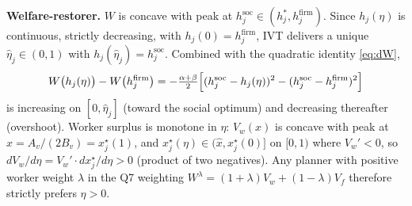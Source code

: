 \documentclass[a4paper,11pt]{article}
\begin{document}
\textbf{Welfare-restorer.} $W$ is concave with peak at $h^{\mathrm{soc}}_j\!\in\!(h^{*}_j,h^{\mathrm{firm}}_j)$. Since $h_j(\eta)$ is continuous, strictly decreasing, with $h_j(0)\!=\!h^{\mathrm{firm}}_j$, IVT delivers a unique $\hat\eta_j\!\in\!(0,1)$ with $h_j(\hat\eta_j)\!=\!h^{\mathrm{soc}}_j$. Combined with the quadratic identity \eqref{eq:dW},
\[
W\bigl(h_j(\eta)\bigr)-W\bigl(h^{\mathrm{firm}}_j\bigr)=-\tfrac{\alpha+\beta}{2}\Bigl[(h^{\mathrm{soc}}_j-h_j(\eta))^{2}-(h^{\mathrm{soc}}_j-h^{\mathrm{firm}}_j)^{2}\Bigr]
\]
is increasing on $[0,\hat\eta_j]$ (toward the social optimum) and decreasing thereafter (overshoot). Worker surplus is monotone in $\eta$: $V_w(x)$ is concave with peak at $\hat x\!=\!A_v/(2B_v)\!=\!x_j^{\star}(1)$, and $x_j^{\star}(\eta)\!\in\!(\hat x,x_j^{\star}(0)]$ on $[0,1)$ where $V_w'<0$, so $dV_w/d\eta\!=\!V_w'\cdot dx_j^{\star}/d\eta>0$ (product of two negatives). Any planner with positive worker weight $\lambda$ in the Q7 weighting $W^{\lambda}=(1+\lambda)V_w+(1-\lambda)V_f$ therefore strictly prefers $\eta\!>\!0$.
\end{document}
